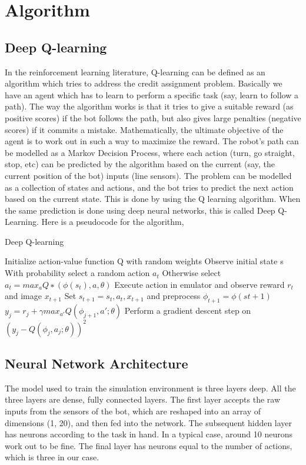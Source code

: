 \documentclass[12pt]{extreport}
\begin{document}
\chapter{Algorithm}

\section{Deep Q-learning}
In the reinforcement learning literature, Q-learning can be defined as an algorithm which tries to address the credit assignment problem. Basically we have an agent which has to learn to perform a specific task (say, learn to follow a path). The way the algorithm works is that it tries to give a suitable reward (as positive scores) if the bot follows the path, but also gives large penalties (negative scores) if it commits a mistake. Mathematically, the ultimate objective of the agent is to work out in such a way to maximize the reward.
The robot’s path can be modelled as a Markov Decision Process, where each action (turn, go straight, stop, etc) can be predicted by the algorithm based on the current (say, the current position of the bot) inputs (line sensors). The problem can be modelled as a collection of states and actions, and the bot tries to predict the next action based on the current state. This is done by using the Q learning algorithm. When the same prediction is done using deep neural networks, this is called Deep Q-Learning.
Here is a pseudocode for the algorithm,

\begin{algorithm}
 \caption{Deep Q-learning}\label{q-learning}
 \begin{algorithmic}[1]
  \State Initialize action-value function Q with random weights
  \State Observe initial state s
  \State With probability select a random action $ a_t $
  \State Otherwise select $ a_t = max_a Q ∗ (\phi(s_t), a, \theta) $
  \State Execute action in emulator and observe reward $ r_t $ and image $ x_{t+1} $
  \State Set $ s_{t+1} = s_t, a_t, x_{t+1} $ and preprocess $ \phi_{t+1} = \phi(st+1) $
  \State $ y_j = r_j + \gamma max_{a'} Q(\phi_{j+1}, a'; \theta) $
  \State Perform a gradient descent step on $ (y_j - Q(\phi_j , a_j ; \theta))^2 $
  \EndFor
  \EndFor
 \end{algorithmic}
\end{algorithm}

\section{Neural Network Architecture}
The model used to train the simulation environment is three layers deep. All the three layers are dense, fully connected layers. The first layer accepts the raw inputs from the sensors of the bot, which are reshaped into an array of dimensions (1, 20), and then fed into the network. The subsequent hidden layer has neurons according to the task in hand. In a typical case, around 10 neurons work out to be fine. The final layer has neurons equal to the number of actions, which is three in our case.
\end{document}

